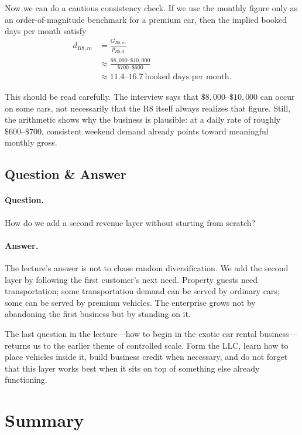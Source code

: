 Now we can do a cautious consistency check. If we use the monthly figure only as an order-of-magnitude benchmark for a premium car, then the implied booked days per month satisfy
\begin{align}
d_{R8,m}
&= \frac{G_{R8,m}}{p_{R8,d}} \\
&\approx
\frac{\$8{,}000\text{--}\$10{,}000}{\$700\text{--}\$600} \\
&\approx 11.4\text{--}16.7 \ \text{booked days per month}.
\end{align}

This should be read carefully. The interview says that \(\$8{,}000\text{--}\$10{,}000\) can occur on some cars, not necessarily that the R8 itself always realizes that figure. Still, the arithmetic shows why the business is plausible: at a daily rate of roughly \(\$600\text{--}\$700\), consistent weekend demand already points toward meaningful monthly gross.

\subsection{Question \& Answer}

\paragraph{Question.}
How do we add a second revenue layer without starting from scratch?

\paragraph{Answer.}
The lecture's answer is not to chase random diversification. We add the second layer by following the first customer's next need. Property guests need transportation; some transportation demand can be served by ordinary cars; some can be served by premium vehicles. The enterprise grows not by abandoning the first business but by standing on it.

The last question in the lecture---how to begin in the exotic car rental business---returns us to the earlier theme of controlled scale. Form the LLC, learn how to place vehicles inside it, build business credit when necessary, and do not forget that this layer works best when it sits on top of something else already functioning.

\section{Summary}

